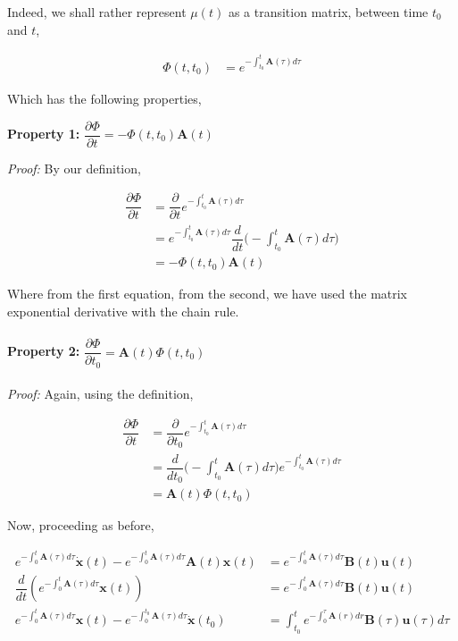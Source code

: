 \documentclass[12pt]{article}
\begin{document}
	Indeed, we shall rather represent $\mu(t)$ as a transition matrix, between time $t_{0}$ and $t$,
	
	\begin{align}
	\Phi(t,t_{0}) &= e^{-\int_{t_{0}}^{t}\mathbf{A}(\tau)d\tau}
	\end{align}
	
	Which has the following properties,
	
	\noindent\textbf{Property 1:} $\dfrac{\partial \Phi}{\partial t} = -\Phi(t,t_{0})\mathbf{A}(t)$
	
	\noindent\textit{Proof:} By our definition,
	
	\begin{align}
	\dfrac{\partial \Phi}{\partial t} &= \dfrac{\partial}{\partial t}e^{-\int_{t_{0}}^{t}\mathbf{A}(\tau)d\tau}\\
	&= e^{-\int_{t_{0}}^{t}\mathbf{A}(\tau)d\tau}\dfrac{d}{dt}\biggr(-\int_{t_{0}}^{t}\mathbf{A}(\tau)d\tau\biggr)\\
	&= -\Phi(t,t_{0})\mathbf{A}(t)
	\end{align}
	
	Where from the first equation, from the second, we have used the matrix exponential derivative with the chain rule.
	\\
	\\
	\noindent\textbf{Property 2:} $\dfrac{\partial \Phi}{\partial t_{0}} = \mathbf{A}(t)\Phi(t,t_{0})$
	\\
	\\
	\noindent\textit{Proof:} Again, using the definition,
	
	\begin{align}
	\dfrac{\partial \Phi}{\partial t} &= \dfrac{\partial}{\partial t_{0}}e^{-\int_{t_{0}}^{t}\mathbf{A}(\tau)d\tau}\\
	&= \dfrac{d}{dt_{0}}\biggr(-\int_{t_{0}}^{t}\mathbf{A}(\tau)d\tau\biggr)e^{-\int_{t_{0}}^{t}\mathbf{A}(\tau)d\tau}\\
	&= \mathbf{A}(t)\Phi(t,t_{0})
	\end{align}
	
	Now, proceeding as before, 
	
	\begin{align}
	e^{-\int_{0}^{t}\mathbf{A}(\tau)d\tau}\dot{\mathbf{x}}(t) - e^{-\int_{0}^{t}\mathbf{A}(\tau)d\tau}\mathbf{A}(t)\mathbf{x}(t) &= e^{-\int_{0}^{t}\mathbf{A}(\tau)d\tau}\mathbf{B}(t)\mathbf{u}(t)\\
	\dfrac{d}{dt}(e^{-\int_{0}^{t}\mathbf{A}(\tau)d\tau}\mathbf{x}(t)) &= e^{-\int_{0}^{t}\mathbf{A}(\tau)d\tau}\mathbf{B}(t)\mathbf{u}(t)\\
	e^{-\int_{0}^{t}\mathbf{A}(\tau)d\tau}\mathbf{x}(t) - e^{-\int_{0}^{t_{0}}\mathbf{A}(\tau)d\tau}\dot{\mathbf{x}}(t_{0}) &= \int_{t_{0}}^{t}e^{-\int_{0}^{\tau}\mathbf{A}(r)dr}\mathbf{B}(\tau)\mathbf{u}(\tau)d\tau
	\end{align}
	
\end{document}
